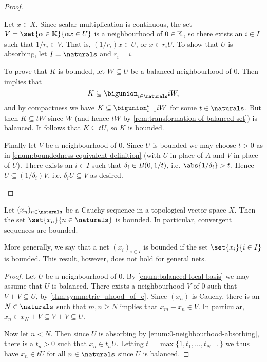 \documentclass[article, a4paper, 11pt, oneside]{memoir}
\numberwithin{equation}{chapter}
\begin{document}
\begin{proof}
\begin{proofsec}
    \item[Proof of \subcref{enum:0-neighbourhood-absorbing}]
    Let $x \in X$. Since scalar multiplication is continuous, the set $V = \set{\alpha \in \field}{\alpha x \in U}$ is a neighbourhood of $0 \in \mathbb{K}$, so there exists an $i \in I$ such that $1/r_i \in V$. That is, $(1/r_i)x \in U$, or $x \in r_i U$. To show that $U$ is absorbing, let $I = \naturals$ and $r_i = i$.

    \item[Proof of \subcref{enum:compact-implies-bounded}]
    To prove that $K$ is bounded, let $W \subseteq U$ be a balanced neighbourhood of $0$. Then  implies that
    \begin{equation*}
        K \subseteq \bigunion_{i \in \naturals} i W,
    \end{equation*}
    and by compactness we have $K \subseteq \bigunion_{i=1}^t i W$ for some $t \in \naturals$. But then $K \subseteq tW$ since $W$ (and hence $tW$ by \cref{rem:transformation-of-balanced-set}) is balanced. It follows that $K \subseteq tU$, so $K$ is bounded.

    \item[Proof of \subcref{enum:bounded-nhood-local-basis}]
    Finally let $V$ be a neighbourhood of $0$. Since $U$ is bounded we may choose $t > 0$ as in \cref{enum:boundedness-equivalent-definition} (with $U$ in place of $A$ and $V$ in place of $U$). There exists an $i \in I$ such that $\delta_i \in B_{}(0,1/t)$, i.e. $\abs{1/\delta_i} > t$. Hence $U \subseteq (1/\delta_i) V$, i.e. $\delta_i U \subseteq V$ as desired.
\end{proofsec}
\end{proof}


\begin{corollary}
    \label{thm:Cauchy-sequence-bounded}
    Let $(x_n)_{n \in \naturals}$ be a Cauchy sequence in a topological vector space $X$. Then the set $\set{x_n}{n \in \naturals}$ is bounded. In particular, convergent sequences are bounded.
\end{corollary}
%
More generally, we say that a net $(x_i)_{i \in I}$ is bounded if the set $\set{x_i}{i \in I}$ is bounded. This result, however, does not hold for general nets.

\begin{proof}
    Let $U$ be a neighbourhood of $0$. By \cref{enum:balanced-local-basis} we may assume that $U$ is balanced. There exists a neighbourhood $V$ of $0$ such that $V + V \subseteq U$, by \cref{thm:symmetric_nhood_of_e}. Since $(x_n)$ is Cauchy, there is an $N \in \naturals$ such that $m,n \geq N$ implies that $x_m - x_n \in V$. In particular, $x_n \in x_N + V \subseteq V + V \subseteq U$.

    Now let $n < N$. Then since $U$ is absorbing by \cref{enum:0-neighbourhood-absorbing}, there is a $t_n > 0$ such that $x_n \in t_n U$. Letting $t = \max\{1, t_1, \ldots, t_{N-1}\}$ we thus have $x_n \in tU$ for all $n \in \naturals$ since $U$ is balanced.
\end{proof}
\end{document}
